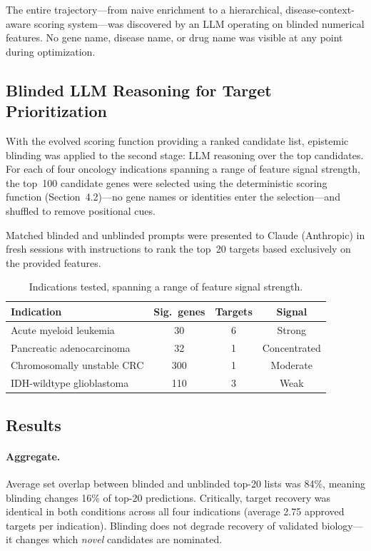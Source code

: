 \documentclass[sigconf, nonacm]{acmart}
\begin{document}
The entire trajectory---from naive enrichment to a hierarchical, disease-context-aware scoring system---was discovered by an LLM operating on blinded numerical features. No gene name, disease name, or drug name was visible at any point during optimization.

\FloatBarrier

\subsection{Blinded LLM Reasoning for Target Prioritization}

With the evolved scoring function providing a ranked candidate list, epistemic blinding was applied to the second stage: LLM reasoning over the top candidates. For each of four oncology indications spanning a range of feature signal strength, the top~100 candidate genes were selected using the deterministic scoring function (Section~4.2)---no gene names or identities enter the selection---and shuffled to remove positional cues.

Matched blinded and unblinded prompts were presented to Claude (Anthropic) in fresh sessions with instructions to rank the top~20 targets based exclusively on the provided features.

\begin{table}[h]
\centering
\small
\begin{tabular}{@{}lccc@{}}
\toprule
\textbf{Indication} & \textbf{Sig.\ genes} & \textbf{Targets} & \textbf{Signal} \\
\midrule
Acute myeloid leukemia & 30 & 6 & Strong \\
Pancreatic adenocarcinoma & 32 & 1 & Concentrated \\
Chromosomally unstable CRC & 300 & 1 & Moderate \\
IDH-wildtype glioblastoma & 110 & 3 & Weak \\
\bottomrule
\end{tabular}
\caption{Indications tested, spanning a range of feature signal strength.}
\label{tab:indications}
\end{table}

\subsection{Results}

\paragraph{Aggregate.} Average set overlap between blinded and unblinded top-20 lists was 84\%, meaning blinding changes 16\% of top-20 predictions. Critically, target recovery was identical in both conditions across all four indications (average 2.75 approved targets per indication). Blinding does not degrade recovery of validated biology---it changes which \textit{novel} candidates are nominated.
\end{document}
